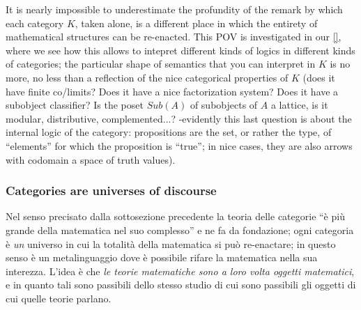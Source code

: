 It is nearly impossible to underestimate the profundity of the remark by which each category $K$, taken alone, is a different place in which the entirety of mathematical structures can be re-enacted. This POV is investigated in our \autoref{}, where we see how this allows to intepret different kinds of logics in different kinds of categories; the particular shape of semantics that you can interpret in $K$ is no more, no less than a reflection of the nice categorical properties of $K$ (does it have finite co/limits? Does it have a nice factorization system? Does it have a subobject classifier? Is the poset $Sub(A)$ of subobjects of $A$ a lattice, is it modular, distributive, complemented...? -evidently this last question is about the internal logic of the category: propositions are the set, or rather the type, of ``elements'' for which the proposition is ``true''; in nice cases, they are also arrows with codomain a space of truth values).
\subsubsection{Categories are universes of discourse}
Nel senso precisato dalla sottosezione precedente la teoria delle categorie ``è più grande della matematica nel suo complesso'' e ne fa da fondazione; ogni categoria è \emph{un} universo in cui la totalità della matematica si può re-enactare; in questo senso è un metalinguaggio dove è possibile rifare la matematica nella sua interezza. L'idea è che \emph{le teorie matematiche sono a loro volta oggetti matematici}, e in quanto tali sono passibili dello stesso studio di cui sono passibili gli oggetti di cui quelle teorie parlano.

